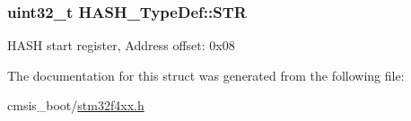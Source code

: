 \subsubsection[{\texorpdfstring{S\+TR}{STR}}]{ uint32\+\_\+t H\+A\+S\+H\+\_\+\+Type\+Def\+::\+S\+TR}\hypertarget{struct_h_a_s_h___type_def_a4b07bc8eb36129062d3f331921316d66}{}\label{struct_h_a_s_h___type_def_a4b07bc8eb36129062d3f331921316d66}
H\+A\+SH start register, Address offset\+: 0x08 

The documentation for this struct was generated from the following file\+:\begin{DoxyCompactItemize}
\item 
cmsis\+\_\+boot/\hyperlink{stm32f4xx_8h}{stm32f4xx.\+h}\end{DoxyCompactItemize}

